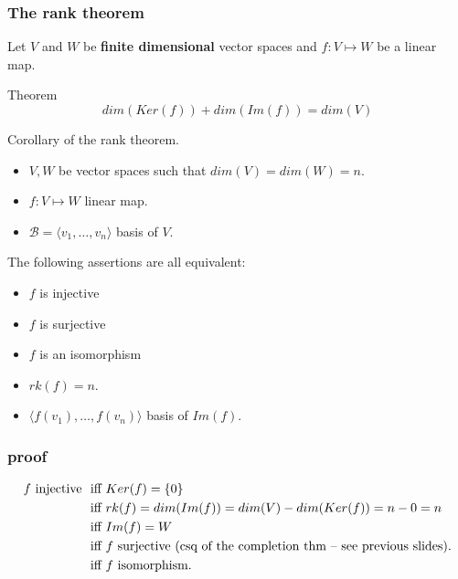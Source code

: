 \documentclass{beamer}
\begin{document}
\begin{frame}
  \frametitle{The rank theorem}
  Let $V$ and $W$ be {\bf finite dimensional} vector spaces and $f: V \mapsto W$ be a linear map.

  \begin{block}{Theorem}
    \[dim(Ker(f)) + dim(Im(f)) = dim(V)\]
  \end{block}
\end{frame}

\begin{frame}
  \begin{block}{Corollary of the rank theorem.}
    \begin{itemize}
    \item $V, W$ be vector spaces such that $dim(V) = dim(W) = n$.
    \item $f: V \mapsto W$ linear map.
    \item $\mathcal{B} = \langle v_1, \dots, v_n\rangle$ basis of $V$.
    \end{itemize}
      The following assertions are all equivalent:
      \begin{itemize}
      \item $f$ is injective
      \item $f$ is surjective
      \item $f$ is an isomorphism
      \item $rk(f) = n$.
      \item $\langle f(v_1), \dots, f(v_n) \rangle$ basis of $Im(f)$.
      \end{itemize}
  \end{block}
\end{frame}

\begin{frame}
  \frametitle{proof}
  \[
  \begin{aligned}
   f \textnormal{ injective } &\textnormal{ iff } Ker(f) = \{0\}\\
    &\textnormal{ iff } rk(f) = dim(Im(f)) = dim(V) - dim(Ker(f)) = n - 0 = n\\
    &\textnormal{ iff } Im(f) = W\\
    &\textnormal{ iff } f \textnormal{ surjective (csq of the completion thm -- see previous slides)}.\\
   &\textnormal{ iff } f\textnormal{ isomorphism}.
  \end{aligned}
  \]
\end{frame}
\end{document}
